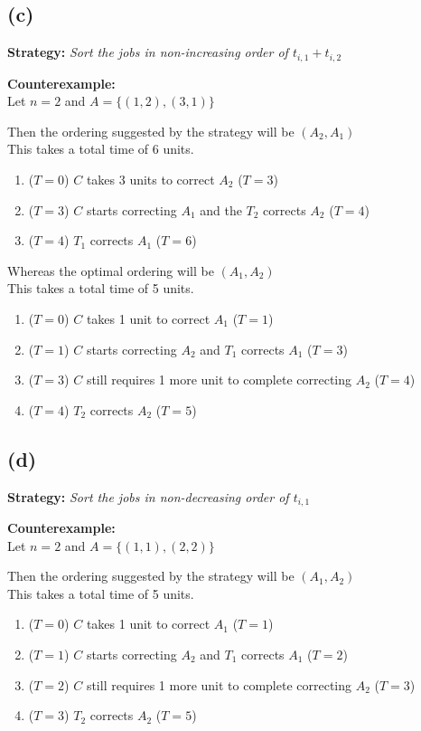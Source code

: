 \documentclass[11pt, fleqn]{article}
\begin{document}
\subsection*{(c)}
\textbf{Strategy:} \textit{Sort the jobs in non-increasing order of $t_{i,1} + t_{i,2}$}

\smallskip
\textbf{Counterexample:}\\
Let $n=2$ and $A = \{(1,2), (3,1)\}$

\smallskip
Then the ordering suggested by the strategy will be $(A_2,A_1)$\\
This takes a total time of 6 units.
\begin{enumerate}[itemsep=-0.5ex,topsep=1pt]
    \item ($T = 0$) $C$ takes 3 units to correct $A_2$ ($T = 3$)
    \item ($T = 3$) $C$ starts correcting $A_1$ and the $T_2$ corrects $A_2$ ($T = 4$)
    \item ($T = 4$) $T_1$ corrects $A_1$ ($T = 6$)
\end{enumerate}

\smallskip
Whereas the optimal ordering will be $(A_1, A_2)$\\
This takes a total time of 5 units.
\begin{enumerate}[itemsep=-0.5ex,topsep=1pt]
    \item ($T = 0$) $C$ takes 1 unit to correct $A_1$ ($T = 1$)
    \item ($T = 1$) $C$ starts correcting $A_2$ and $T_1$ corrects $A_1$ ($T = 3$)
    \item ($T = 3$) $C$ still requires 1 more unit to complete correcting $A_2$ ($T = 4$)
    \item ($T = 4$) $T_2$ corrects $A_2$ ($T = 5$)
\end{enumerate}

\subsection*{(d)}
\textbf{Strategy:} \textit{Sort the jobs in non-decreasing order of $t_{i,1}$}

\smallskip
\textbf{Counterexample:}\\
Let $n=2$ and $A = \{(1,1), (2,2)\}$

\smallskip
Then the ordering suggested by the strategy will be $(A_1,A_2)$\\
This takes a total time of 5 units.
\begin{enumerate}[itemsep=-0.5ex,topsep=1pt]
    \item ($T = 0$) $C$ takes 1 unit to correct $A_1$ ($T = 1$)
    \item ($T = 1$) $C$ starts correcting $A_2$ and $T_1$ corrects $A_1$ ($T = 2$)
    \item ($T = 2$) $C$ still requires 1 more unit to complete correcting $A_2$ ($T = 3$)
    \item ($T = 3$) $T_2$ corrects $A_2$ ($T = 5$)
\end{enumerate}
\end{document}
